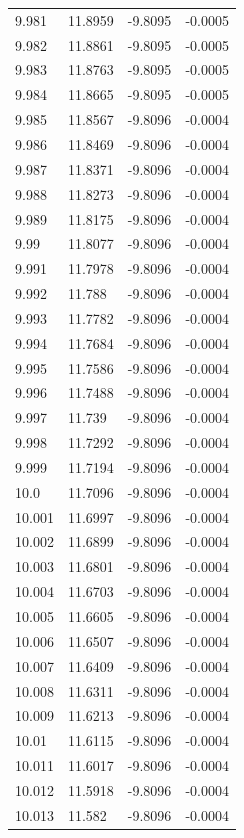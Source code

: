 \begin{tabular}{llll}
9.981 & 11.8959 & -9.8095 & -0.0005 \\
9.982 & 11.8861 & -9.8095 & -0.0005 \\
9.983 & 11.8763 & -9.8095 & -0.0005 \\
9.984 & 11.8665 & -9.8095 & -0.0005 \\
9.985 & 11.8567 & -9.8096 & -0.0004 \\
9.986 & 11.8469 & -9.8096 & -0.0004 \\
9.987 & 11.8371 & -9.8096 & -0.0004 \\
9.988 & 11.8273 & -9.8096 & -0.0004 \\
9.989 & 11.8175 & -9.8096 & -0.0004 \\
9.99 & 11.8077 & -9.8096 & -0.0004 \\
9.991 & 11.7978 & -9.8096 & -0.0004 \\
9.992 & 11.788 & -9.8096 & -0.0004 \\
9.993 & 11.7782 & -9.8096 & -0.0004 \\
9.994 & 11.7684 & -9.8096 & -0.0004 \\
9.995 & 11.7586 & -9.8096 & -0.0004 \\
9.996 & 11.7488 & -9.8096 & -0.0004 \\
9.997 & 11.739 & -9.8096 & -0.0004 \\
9.998 & 11.7292 & -9.8096 & -0.0004 \\
9.999 & 11.7194 & -9.8096 & -0.0004 \\
10.0 & 11.7096 & -9.8096 & -0.0004 \\
10.001 & 11.6997 & -9.8096 & -0.0004 \\
10.002 & 11.6899 & -9.8096 & -0.0004 \\
10.003 & 11.6801 & -9.8096 & -0.0004 \\
10.004 & 11.6703 & -9.8096 & -0.0004 \\
10.005 & 11.6605 & -9.8096 & -0.0004 \\
10.006 & 11.6507 & -9.8096 & -0.0004 \\
10.007 & 11.6409 & -9.8096 & -0.0004 \\
10.008 & 11.6311 & -9.8096 & -0.0004 \\
10.009 & 11.6213 & -9.8096 & -0.0004 \\
10.01 & 11.6115 & -9.8096 & -0.0004 \\
10.011 & 11.6017 & -9.8096 & -0.0004 \\
10.012 & 11.5918 & -9.8096 & -0.0004 \\
10.013 & 11.582 & -9.8096 & -0.0004 \\

\end{tabular}

